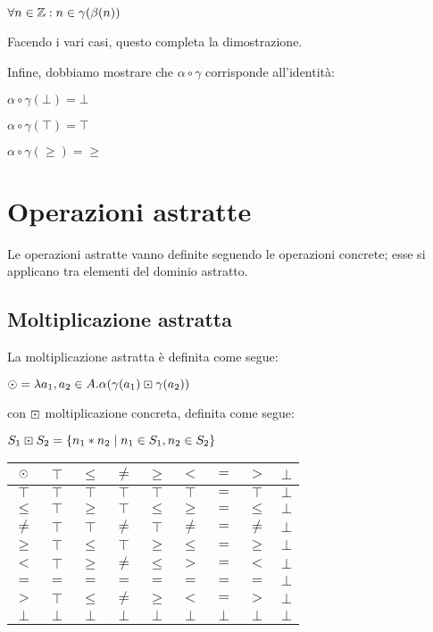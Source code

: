\begin{center}
	$ \forall n \in \mathbb{Z} : n \in \gamma(\beta(n)) $
\end{center}
Facendo i vari casi, questo completa la dimostrazione.

Infine, dobbiamo mostrare che $\alpha \circ \gamma$ corrisponde all'identità:
\begin{center}
	$ \alpha \circ \gamma(\bot) = \bot $
\end{center}
\begin{center}
	$ \alpha \circ \gamma(\top) = \top $
\end{center}
\begin{center}
	$ \alpha \circ \gamma(\geq) = \geq $
\end{center}

\section{Operazioni astratte}
Le operazioni astratte vanno definite seguendo le operazioni concrete; esse si applicano tra elementi del dominio astratto.

\subsection{Moltiplicazione astratta}

La moltiplicazione astratta è definita come segue:

\begin{center}
	$ \mathbin{\odot} = \lambda a_1,a_2 \in A . \alpha(\gamma(a_1) \mathbin{\boxdot} \gamma(a_2)) $
\end{center}
con $\mathbin{\boxdot}$ moltiplicazione concreta, definita come segue:

\begin{center}
	$ S_1 \mathbin{\boxdot} S_2 = \{ n_1 * n_2 \mid n_1 \in S_1, n_2 \in S_2 \} $
\end{center}

\begin{center}
	\begin{tabular}{ c | c c c c c c c c }
		$\mathbin{\odot}$ & $\top$ & $\leq$ & $\neq$ & $\geq$ & $<$ & $=$ & $>$ & $\bot$ \\
		\hline
		$\top$ & $\top$ & $\top$ & $\top$ & $\top$ & $\top$ & $=$ & $\top$ & $\bot$  \\
		$\leq$ & $\top$ & $\geq$ & $\top$ & $\leq$ & $\geq$ & $=$ & $\leq$ & $\bot$\\
		$\neq$ & $\top$ & $\top$ & $\neq$ & $\top$ & $\neq$ & $=$ & $\neq$ & $\bot$ \\
		$\geq$ & $\top$ & $\leq$ & $\top$ & $\geq$ & $\leq$ & $=$ & $\geq$ & $\bot$ \\

		$<$ & $\top$ & $\geq$ & $\neq$ & $\leq$ & $>$ & $=$ & $<$ & $\bot$ \\
		$=$ & $=$ & $=$ & $=$ & $=$ & $=$ & $=$ & $=$ & $\bot$\\
		$>$ & $\top$ & $\leq$ & $\neq$ & $\geq$ & $<$ & $=$ & $>$ & $\bot$\\
		$\bot$ & $\bot$ & $\bot$ & $\bot$ & $\bot$ & $\bot$ & $\bot$ & $\bot$ & $\bot$ \\
	\end{tabular}
\end{center}

